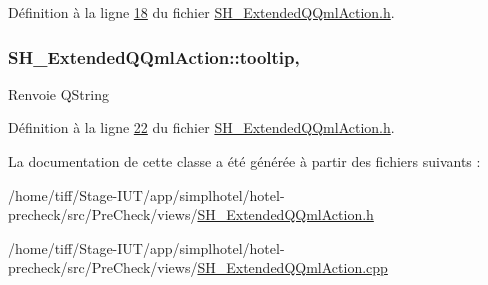 Définition à la ligne \hyperlink{SH__ExtendedQQmlAction_8h_source_l00018}{18} du fichier \hyperlink{SH__ExtendedQQmlAction_8h_source}{S\-H\-\_\-\-Extended\-Q\-Qml\-Action.\-h}.

\hypertarget{classSH__ExtendedQQmlAction_a09728d442bc94953fc35e0eb9ece89c1}{
\subsubsection[{tooltip}]{\setlength{\rightskip}{0pt plus 5cm}S\-H\-\_\-\-Extended\-Q\-Qml\-Action\-::tooltip\hspace{0.3cm}{\ttfamily [read]}, {\ttfamily [write]}}}\label{classSH__ExtendedQQmlAction_a09728d442bc94953fc35e0eb9ece89c1}
\begin{DoxyReturn}{Renvoie}
Q\-String 
\end{DoxyReturn}


Définition à la ligne \hyperlink{SH__ExtendedQQmlAction_8h_source_l00022}{22} du fichier \hyperlink{SH__ExtendedQQmlAction_8h_source}{S\-H\-\_\-\-Extended\-Q\-Qml\-Action.\-h}.



La documentation de cette classe a été générée à partir des fichiers suivants \-:\begin{DoxyCompactItemize}
\item 
/home/tiff/\-Stage-\/\-I\-U\-T/app/simplhotel/hotel-\/precheck/src/\-Pre\-Check/views/\hyperlink{SH__ExtendedQQmlAction_8h}{S\-H\-\_\-\-Extended\-Q\-Qml\-Action.\-h}\item 
/home/tiff/\-Stage-\/\-I\-U\-T/app/simplhotel/hotel-\/precheck/src/\-Pre\-Check/views/\hyperlink{SH__ExtendedQQmlAction_8cpp}{S\-H\-\_\-\-Extended\-Q\-Qml\-Action.\-cpp}\end{DoxyCompactItemize}
